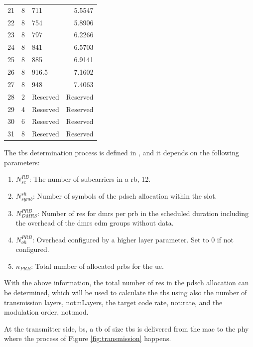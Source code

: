 \begin{table}[htb]
\begin{tabularx}{0.95\columnwidth}{l X X r}
  21 &  8   & 711       &  5.5547 \\
  22 &  8   & 754       &  5.8906 \\
  23 &  8   & 797       &  6.2266 \\
  24 &  8   & 841       &  6.5703 \\
  25 &  8   & 885       &  6.9141 \\
  26 &  8   & 916.5     &  7.1602 \\
  27 &  8   & 948       &  7.4063 \\
  28 &  2   & Reserved  & Reserved \\
  29 &  4   & Reserved  & Reserved \\
  30 &  6   & Reserved  & Reserved \\
  31 &  8   & Reserved  & Reserved \\
  \bottomrule
\end{tabularx}
\end{table}

The \gls{tbs} determination process is defined in \cite[Section 5.1.3.2]{3gpp.38.214}, and it depends on the following parameters:

\begin{enumerate}
    \item $N_{sc}^{RB}$: The number of subcarriers in a \gls{rb}, 12.
    \item $N_{symb}^{sh}$: Number of symbols of the \gls{pdsch} allocation within the slot.
    \item $N_{DMRS}^{PRB}$: Number of \glspl{re} for \gls{dmrs} per \gls{prb} in the scheduled duration including the overhead of the \gls{dmrs} \gls{cdm} groups without data.
    \item $N_{oh}^{PRB}$: Overhead configured by a higher layer parameter. Set to 0 if not configured.
    \item $n_{PRB}$: Total number of allocated \glspl{prb} for the \gls{ue}.
\end{enumerate}

With the above information, the total number of \glspl{re} in the \gls{pdsch} allocation can be determined, which will be used to calculate the \gls{tbs} using also the number of transmission layers, \gls{not:nLayers}, the target code rate, \gls{not:rate}, and the modulation order, \gls{not:mod}.

At the transmitter side, \gls{bs}, a \gls{tb} of size \gls{tbs} is delivered from the \gls{mac} to the \gls{phy} where the process of Figure \ref{fig:transmission} happens.

